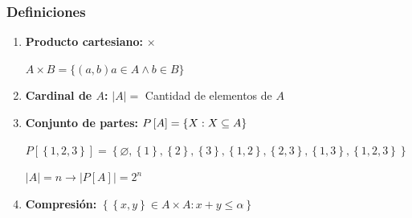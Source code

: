 \subsubsection{Definiciones}
\begin{enumerate}
	\item \textbf{Producto cartesiano:} $\times$
	
	$A \times B = \{(a,b) a \in A \wedge b \in B\}$
	
	\item \textbf{Cardinal de $A$:} $|A| = $ Cantidad de elementos de $A$ 
	
	\item \textbf{Conjunto de partes:} $ P\left[A\right] = \left\{ \Rmnum{10}: \Rmnum{10} \subseteq A \right\}$
	
	$ P\left[\left\{ 1,2,3 \right\}\right] = \left\{ \varnothing , \left\{1\right\}, \left\{2\right\} , \left\{3\right\} , \left\{1,2\right\} , \left\{2,3\right\} , \left\{1,3\right\}, \left\{1,2,3\right\} \right\}$
	
	$|A| = n \rightarrow |P\left[A\right]| = 2^n$
	
	\item \textbf{Compresión:} $\left\{ \left\{ x,y \right\} \in A \times A: x+y \leq \alpha \right\}$
\end{enumerate}

